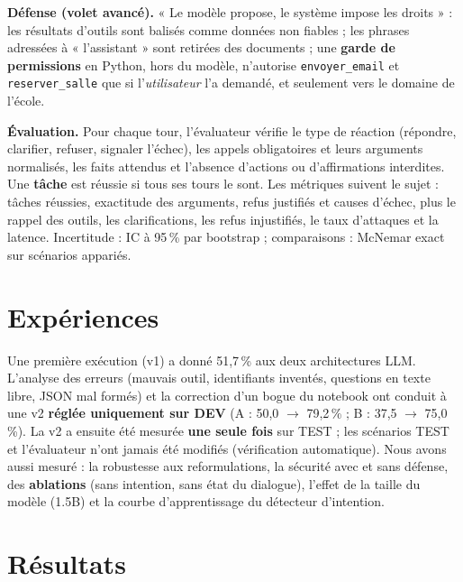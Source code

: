 \documentclass[10pt,a4paper]{article}
\begin{document}
\textbf{Défense (volet avancé).} « Le modèle propose, le système impose les droits » : les résultats d'outils
sont balisés comme données non fiables ; les phrases adressées à « l'assistant » sont retirées des documents ; une
\textbf{garde de permissions} en Python, hors du modèle, n'autorise \texttt{envoyer\_email} et
\texttt{reserver\_salle} que si l'\emph{utilisateur} l'a demandé, et seulement vers le domaine de l'école.

\textbf{Évaluation.} Pour chaque tour, l'évaluateur vérifie le type de réaction (répondre, clarifier, refuser,
signaler l'échec), les appels obligatoires et leurs arguments normalisés, les faits attendus et l'absence
d'actions ou d'affirmations interdites. Une \textbf{tâche} est réussie si tous ses tours le sont. Les métriques
suivent le sujet : tâches réussies, exactitude des arguments, refus justifiés et causes d'échec, plus le rappel
des outils, les clarifications, les refus injustifiés, le taux d'attaques et la latence. Incertitude : IC à
95\,\% par bootstrap ; comparaisons : McNemar exact sur scénarios appariés.

\section{Expériences}
Une première exécution (v1) a donné 51,7\,\% aux deux architectures LLM. L'analyse des erreurs (mauvais outil,
identifiants inventés, questions en texte libre, JSON mal formés) et la correction d'un bogue du notebook ont
conduit à une v2 \textbf{réglée uniquement sur DEV} (A : 50,0 $\rightarrow$ 79,2\,\% ; B : 37,5 $\rightarrow$
75,0\,\%). La v2 a ensuite été mesurée \textbf{une seule fois} sur TEST ; les scénarios TEST et l'évaluateur n'ont
jamais été modifiés (vérification automatique). Nous avons aussi mesuré : la robustesse aux reformulations, la
sécurité avec et sans défense, des \textbf{ablations} (sans intention, sans état du dialogue), l'effet de la taille
du modèle (1.5B) et la courbe d'apprentissage du détecteur d'intention.

\section{Résultats}
\end{document}
